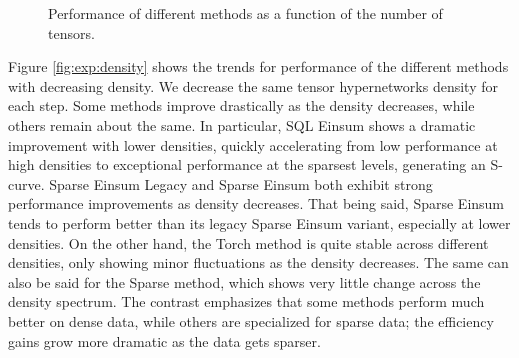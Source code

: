 \begin{figure}[H]
    \caption{Performance of different methods as a function of the number of tensors.}
    \label{fig:exp:num_tensors}
\end{figure}

Figure \ref{fig:exp:density} shows the trends for performance of the different methods with 
decreasing density. We decrease the same tensor hypernetworks density for each step. Some methods 
improve drastically as the density decreases, while others remain about the same. In particular, 
SQL Einsum shows a dramatic improvement with lower densities, quickly accelerating from low 
performance at high densities to exceptional performance at the sparsest levels, generating an
S-curve. Sparse Einsum Legacy and Sparse Einsum both exhibit strong performance improvements as density decreases. That being said, 
Sparse Einsum tends to perform better than its legacy Sparse Einsum variant, especially at 
lower densities. On the other hand, the Torch method is quite stable across different densities, 
only showing minor fluctuations as the density decreases. The same can also be said for the 
Sparse method, which shows very little change across the density spectrum. The contrast 
emphasizes that some methods perform much better on dense data, while others are specialized 
for sparse data; the efficiency gains grow more dramatic as the data gets sparser.


